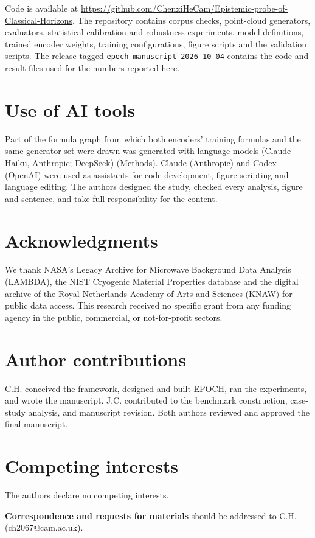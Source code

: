 \documentclass{article}
\begin{document}
Code is available at
\url{https://github.com/ChenxiHeCam/Epistemic-probe-of-Classical-Horizons}. The
repository contains corpus checks, point-cloud generators, evaluators,
statistical calibration and robustness experiments, model definitions, trained encoder weights, training
configurations, figure scripts and the validation scripts. The release tagged \texttt{epoch-manuscript-2026-10-04} contains the code and result files used for the numbers reported here.


\section{Use of AI tools}

Part of the formula graph from which both encoders' training formulas and the same-generator set were drawn was generated with language models (Claude Haiku, Anthropic; DeepSeek) (Methods). Claude (Anthropic) and Codex (OpenAI) were used as assistants for code development, figure scripting and language editing. The authors designed the study, checked every analysis, figure and sentence, and take full responsibility for the content.

\section{Acknowledgments}

We thank NASA's Legacy Archive for Microwave Background Data Analysis (LAMBDA), the NIST Cryogenic Material Properties database and the
digital archive of the Royal Netherlands Academy of Arts and Sciences (KNAW) for public data access. This research received no specific
grant from any funding agency in the public, commercial, or not-for-profit
sectors.

\section{Author contributions}

C.H. conceived the framework, designed and built EPOCH, ran the experiments, and
wrote the manuscript. J.C. contributed to the benchmark construction, case-study
analysis, and manuscript revision. Both authors reviewed and approved the final
manuscript.

\section{Competing interests}

The authors declare no competing interests.

\textbf{Correspondence and requests for materials} should be addressed to C.H.
(ch2067@cam.ac.uk).

\clearpage



\end{document}
